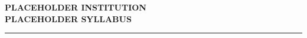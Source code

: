 \documentclass[10pt, letterpaper, oneside]{article}
\newcommand{\Institution}{PLACEHOLDER INSTITUTION}
\newcommand{\Syllabus}{PLACEHOLDER SYLLABUS}
\begin{document}
\begin{center}
    {\large\bfseries \Institution} \\
    \vspace{4pt}
    \textbf{\Syllabus} \\
    \rule{\textwidth}{1pt}
\end{center}

\vspace{10pt}



\vspace{10pt}



\end{document}
